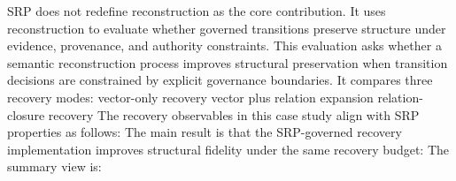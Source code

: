 {}SRP does not redefine reconstruction as the core contribution. It uses reconstruction to evaluate whether governed transitions preserve structure under evidence, provenance, and authority constraints.\markdownRendererInterblockSeparator
{}
\markdownRendererSectionEnd \markdownRendererSectionBegin
{}\markdownRendererInterblockSeparator
{}This evaluation asks whether a semantic reconstruction process improves structural preservation when transition decisions are constrained by explicit governance boundaries.\markdownRendererParagraphSeparator
{}It compares three recovery modes:\markdownRendererInterblockSeparator
{}\markdownRendererUlBeginTight
\markdownRendererUlItem vector-only recovery\markdownRendererUlItemEnd 
\markdownRendererUlItem vector plus relation expansion\markdownRendererUlItemEnd 
\markdownRendererUlItem relation-closure recovery\markdownRendererUlItemEnd 
\markdownRendererUlEndTight \markdownRendererInterblockSeparator
{}The recovery observables in this case study align with SRP properties as follows:\markdownRendererInterblockSeparator
{}\markdownRendererInterblockSeparator
{}
\markdownRendererSectionEnd \markdownRendererSectionBegin
{}\markdownRendererInterblockSeparator
{}The main result is that the SRP-governed recovery implementation improves structural fidelity under the same recovery budget:\markdownRendererInterblockSeparator
{}\markdownRendererInterblockSeparator
{}The summary view is:\markdownRendererInterblockSeparator
{}\markdownRendererInterblockSeparator
{}
\markdownRendererSectionEnd \markdownRendererSectionBegin
{}\markdownRendererInterblockSeparator
